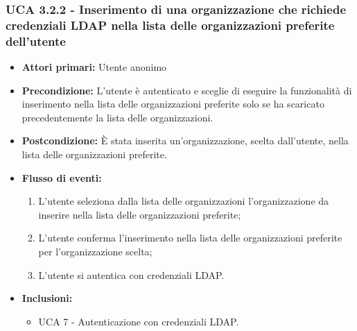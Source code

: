 \subsubsection{UCA 3.2.2 - Inserimento di una organizzazione che richiede credenziali LDAP nella lista delle organizzazioni preferite dell'utente}%
\begin{itemize}
	\item \textbf{Attori primari:} Utente anonimo
	\item \textbf{Precondizione:} L'utente è autenticato e sceglie di eseguire la funzionalità di inserimento nella lista delle organizzazioni preferite solo se ha scaricato precedentemente la lista delle organizzazioni.
	\item \textbf{Postcondizione:} È stata inserita un'organizzazione, scelta dall'utente, nella lista delle organizzazioni preferite.
	\item \textbf{Flusso di eventi:}
	\begin{enumerate}
		\item L'utente seleziona dalla lista delle organizzazioni l'organizzazione da inserire nella lista delle organizzazioni preferite;
		\item L'utente conferma l'inserimento nella lista delle organizzazioni preferite per l'organizzazione scelta;
		\item L'utente si autentica con credenziali LDAP.
	\end{enumerate}
	\item \textbf{Inclusioni:}
	\begin{itemize}
			\item UCA 7 - Autenticazione con credenziali LDAP.
	\end{itemize}
\end{itemize}

